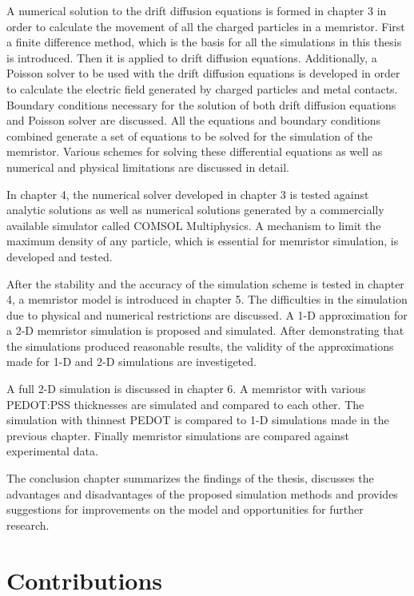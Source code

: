 \begin{doublespace}
A numerical solution to the drift diffusion equations is formed in chapter 3 in order to calculate the movement of all the charged particles in a memristor. First a finite difference method, which is the basis for all the simulations in this thesis is introduced. Then it is applied to drift diffusion equations. Additionally, a Poisson solver to be used with the drift diffusion equations is developed in order to calculate the electric field generated by charged particles and metal contacts. Boundary conditions necessary for the solution of both drift diffusion equations and Poisson solver are discussed. All the equations and boundary conditions combined generate a set of equations to be solved for the simulation of the memristor. Various schemes for solving these differential equations as well as numerical and physical limitations are discussed in detail.
 
In chapter 4, the numerical solver developed in chapter 3 is tested against analytic solutions as well as numerical solutions generated by a commercially available simulator called COMSOL Multiphysics. A mechanism to limit the maximum density of any particle, which is essential for memristor simulation, is developed and tested. 

After the stability and the accuracy of the simulation scheme is tested in chapter 4, a memristor model is introduced in chapter 5. The difficulties in the simulation due to physical and numerical restrictions are discussed. A 1-D approximation for a 2-D memristor simulation is proposed and simulated. After demonstrating that the simulations produced reasonable results, the validity of the approximations made for 1-D and 2-D simulations are investigeted.  

A full 2-D simulation is discussed in chapter 6. A memristor with various PEDOT:PSS thicknesses are simulated and compared to each other. The simulation with thinnest PEDOT is compared to 1-D simulations made in the previous chapter. Finally memristor simulations are compared against experimental data.

The conclusion chapter summarizes the findings of the thesis, discusses the advantages and disadvantages of the proposed simulation methods and provides suggestions for improvements on the model and opportunities for further research.

\section{Contributions}


\end{doublespace}
